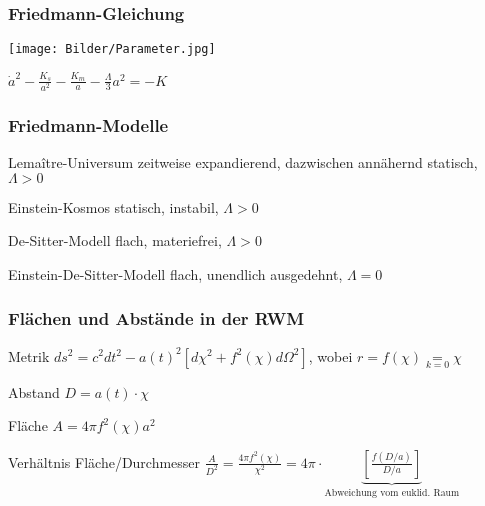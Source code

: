 \documentclass{beamer}
\begin{document}
\begin{frame}\frametitle{Friedmann-Gleichung}

\centering

\texttt{[image: Bilder/Parameter.jpg]}

\vspace{.5cm}

$\boxed{\dot{a}^2 - \frac{K_s}{a^2} - \frac{K_m}{a} - \frac{\Lambda}{3}a^2 = -K}$

\end{frame}

\begin{frame}\frametitle{Friedmann-Modelle}

\begin{block}{Lemaître-Universum}
zeitweise expandierend, dazwischen annähernd statisch, \quad $\Lambda > 0$
\end{block}

\begin{block}{Einstein-Kosmos}
statisch, instabil, \quad $\Lambda > 0$
\end{block}

\begin{block}{De-Sitter-Modell}
flach, \glqq materiefrei\grqq, \quad $\Lambda > 0$
\end{block}

\begin{block}{Einstein-De-Sitter-Modell}
flach, unendlich ausgedehnt, \quad $\Lambda = 0$
\end{block}

\end{frame}

\begin{frame}\frametitle{Flächen und Abstände in der RWM}

\begin{block}{Metrik}
$ds^2 = c^2dt^2 - a(t)^2[d\chi^2 + f^2(\chi)d\Omega^2]$, wobei $r = f(\chi) \underset{k=0} {=}\chi$
\end{block}

\begin{block}{Abstand}
$D = a(t) \cdot \chi$
\end{block}

\begin{block}{Fläche}
$A = 4\pi f^2(\chi) a^2$
\end{block}

\begin{block}{Verhältnis Fläche/Durchmesser}
$\frac{A}{D^2} = \frac{4\pi f^2(\chi)}{\chi^2 } = 4\pi \cdot \underbrace{[\frac{f(D/a)}{D/a}]}_{\text{Abweichung vom euklid. Raum}}$
\end{block}

\end{frame}
\end{document}
